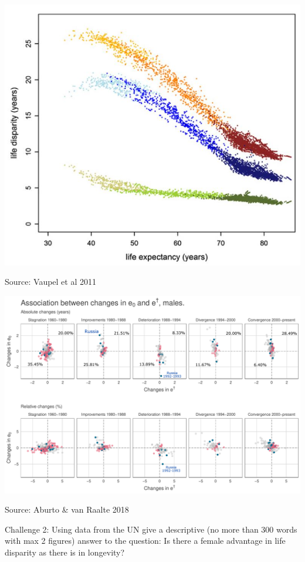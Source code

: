 \documentclass[xcolor={dvipsnames}]{beamer}
\begin{document}
\begin{frame}
\begin{center}
\includegraphics[scale=.39]{Figures/Life_disparity_1}
\end{center}

\tiny{Source: Vaupel et al 2011}
\end{frame}


\begin{frame}
\begin{center}
\includegraphics[scale=.28]{Figures/changes_males}
\end{center}

\tiny{Source: Aburto \& van Raalte 2018}
\end{frame}

\begin{frame}
\Large{Challenge 2: Using data from the UN give a descriptive (no more than 300 words with max 2 figures) answer to the question: Is there a female advantage in life disparity as there is in longevity? }
\end{frame}
\end{document}
